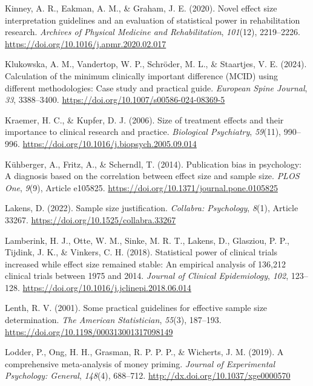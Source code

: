 \documentclass[authordate, meta]{jote-new-article}
\begin{document}
	Kinney, A. R., Eakman, A. M., \& Graham, J. E. (2020). Novel effect size interpretation guidelines and an evaluation of statistical power in rehabilitation research. \emph{Archives of Physical Medicine and Rehabilitation}, \emph{101}(12), 2219--2226. \url{https://doi.org/10.1016/j.apmr.2020.02.017}



	Klukowska, A. M., Vandertop, W. P., Schröder, M. L., \& Staartjes, V. E. (2024). Calculation of the minimum clinically important difference (MCID) using different methodologies: Case study and practical guide. \emph{European Spine Journal}, \emph{33}, 3388--3400. \url{https://doi.org/10.1007/s00586-024-08369-5}



	Kraemer, H. C., \& Kupfer, D. J. (2006). Size of treatment effects and their importance to clinical research and practice. \emph{Biological Psychiatry}, \emph{59}(11), 990--996. \url{https://doi.org/10.1016/j.biopsych.2005.09.014}



	Kühberger, A., Fritz, A., \& Scherndl, T. (2014). Publication bias in psychology: A diagnosis based on the correlation between effect size and sample size. \emph{PLOS One}, \emph{9}(9), Article e105825. \url{https://doi.org/10.1371/journal.pone.0105825}



	Lakens, D. (2022). Sample size justification. \emph{Collabra: Psychology}, \emph{8}(1), Article 33267. \url{https://doi.org/10.1525/collabra.33267}



	Lamberink, H. J., Otte, W. M., Sinke, M. R. T., Lakens, D., Glasziou, P. P., Tijdink, J. K., \& Vinkers, C. H. (2018). Statistical power of clinical trials increased while effect size remained stable: An empirical analysis of 136,212 clinical trials between 1975 and 2014. \emph{Journal of Clinical Epidemiology}, \emph{102}, 123--128. \url{https://doi.org/10.1016/j.jclinepi.2018.06.014}



	Lenth, R. V. (2001). Some practical guidelines for effective sample size determination. \emph{The American Statistician}, \emph{55}(3), 187--193. \url{https://doi.org/10.1198/000313001317098149}



	Lodder, P., Ong, H. H., Grasman, R. P. P. P., \& Wicherts, J. M. (2019). A comprehensive meta-analysis of money priming. \emph{Journal of Experimental Psychology: General}, \emph{148}(4), 688--712. \url{http://dx.doi.org/10.1037/xge0000570}
\end{document}
